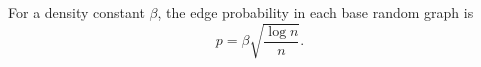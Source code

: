 \begin{definition}
For a density constant \(\beta\), the edge probability in each base random
graph is
\[
p=\beta\sqrt{\frac{\log n}{n}}.
\]
\end{definition}
